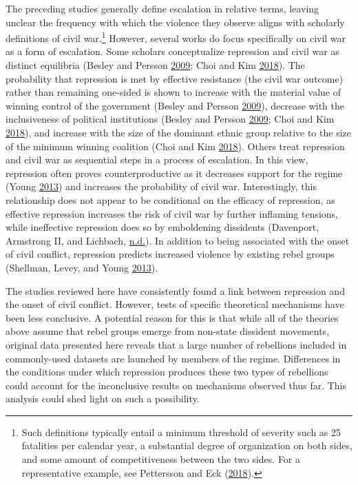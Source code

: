 \documentclass[12pt,]{article}
\let\rmarkdownfootnote\footnote%
\def\footnote{\protect\rmarkdownfootnote}
\theoremstyle{definition}
\theoremstyle{definition}
\theoremstyle{definition}
\theoremstyle{remark}
\begin{document}
The preceding studies generally define escalation in relative terms,
leaving unclear the frequency with which the violence they observe
aligns with scholarly definitions of civil war.\footnote{Such
  definitions typically entail a minimum threshold of severity such as
  25 fatalities per calendar year, a substantial degree of organization
  on both sides, and some amount of competitiveness between the two
  sides. For a representative example, see Pettersson and Eck
  (\protect\hyperlink{ref-Pettersson2018}{2018}).} However, several
works do focus specifically on civil war as a form of escalation. Some
scholars conceptualize repression and civil war as distinct equilibria
(Besley and Persson \protect\hyperlink{ref-Besley2009}{2009}; Choi and
Kim \protect\hyperlink{ref-Choi2018}{2018}). The probability that
repression is met by effective resistance (the civil war outcome) rather
than remaining one-sided is shown to increase with the material value of
winning control of the government (Besley and Persson
\protect\hyperlink{ref-Besley2009}{2009}), decrease with the
inclusiveness of political institutions (Besley and Persson
\protect\hyperlink{ref-Besley2009}{2009}; Choi and Kim
\protect\hyperlink{ref-Choi2018}{2018}), and increase with the size of
the dominant ethnic group relative to the size of the minimum winning
coalition (Choi and Kim \protect\hyperlink{ref-Choi2018}{2018}). Others
treat repression and civil war as sequential steps in a process of
escalation. In this view, repression often proves counterproductive as
it decreases support for the regime (Young
\protect\hyperlink{ref-Young2013}{2013}) and increases the probability
of civil war. Interestingly, this relationship does not appear to be
conditional on the efficacy of repression, as effective repression
increases the risk of civil war by further inflaming tensions, while
ineffective repression does so by emboldening dissidents (Davenport,
Armstrong II, and Lichbach, \protect\hyperlink{ref-Davenportnd}{n.d.}).
In addition to being associated with the onset of civil conflict,
repression predicts increased violence by existing rebel groups
(Shellman, Levey, and Young \protect\hyperlink{ref-Shellman2013}{2013}).

The studies reviewed here have consistently found a link between
repression and the onset of civil conflict. However, tests of specific
theoretical mechanisms have been less conclusive. A potential reason for
this is that while all of the theories above assume that rebel groups
emerge from non-state dissident movements, original data presented here
reveals that a large number of rebellions included in commonly-used
datasets are launched by members of the regime. Differences in the
conditions under which repression produces these two types of rebellions
could account for the inconclusive results on mechanisms observed thus
far. This analysis could shed light on such a possibility.
\end{document}
